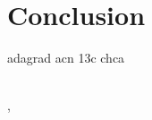 \chapter{Conclusion}
\label{chap:conclusion}

\cite{example_reference_1}\cite{example_reference_2}\cite{example_reference_3}\cite{example_reference_4}
\gls{adagrad} \gls{acn}
\acrshort{13c}
\gls{chca}

~\\[1cm]
\Locality, \Date
~\\[1cm]
\Author